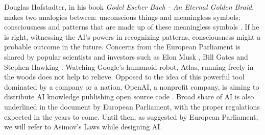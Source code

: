 Douglas Hofstadter, in his book \emph{Godel Escher Bach - An Eternal Golden Braid}, makes two analogies between: unconscious things and meaningless symbols; consciousness and patterns that are made up of these meaningless symbols \cite{hofstadter1980godel}. 
If he is right, witnessing the AI's powers in recognizing patterns, consciousness might a probable outcome in the future. 
Concerns from the European Parliament is shared by popular scientists and investors such as Elon Musk \cite{AIthreatEMusk}, Bill Gates \cite{AIthreatBGates} and Stephen Hawking \cite{AIthreatSHawking}. Watching Google's humanoid robot, Atlas, running freely in the woods does not help to relieve. Opposed to the idea of this powerful tool dominated by a company or a nation, OpenAI, a nonprofit company, is aiming to distribute AI knowledge publishing open source code \cite{openAI}. Broad share of AI is also underlined in the document by European Parliament, with the proper regulations expected in the years to come.
Until then, as suggested by European Parliament, we will refer to Asimov's Laws while designing AI.



